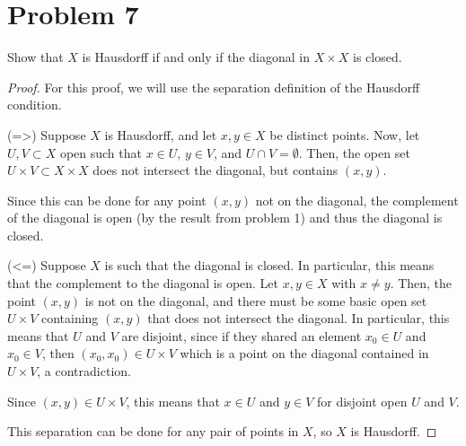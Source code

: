 \documentclass[fontsize=11pt]{scrartcl} %
\numberwithin{equation}{section} %
\numberwithin{figure}{section} %
\numberwithin{table}{section} %
\begin{document}
\section*{Problem 7}
Show that $X$ is Hausdorff if and only if the diagonal in $X\times X$ is closed.
\\
\begin{proof}
For this proof, we will use the separation definition of the Hausdorff condition.

(=>)
Suppose $X$ is Hausdorff, and let $x,y\in X$ be distinct points. Now, let $U,V\subset X$ open
such that $x\in U$, $y\in V$, and $U\cap V = \emptyset$. Then, the open set
$U\times V\subset X\times X$ does not intersect the diagonal, but contains $(x,y)$.

Since this can be done for any point $(x,y)$ not on the diagonal, the complement of the diagonal
is open (by the result from problem 1) and thus the diagonal is closed.

(<=)
Suppose $X$ is such that the diagonal is closed. In particular, this means that the
complement to the diagonal is open. Let $x,y\in X$ with $x\neq y$. Then, the point
$(x,y)$ is not on the diagonal, and there must be some basic open set $U\times V$ containing
$(x,y)$ that does not intersect the diagonal. In particular, this means that $U$ and $V$
are disjoint, since if they shared an element $x_0\in U$ and $x_0\in V$, then $(x_0,x_0)\in U\times V$
which is a point on the diagonal contained in $U\times V$, a contradiction.

Since $(x,y)\in U\times V$, this means that $x\in U$ and $y\in V$ for disjoint open $U$ and $V$.

This separation can be done for any pair of points in $X$, so $X$ is Hausdorff.
\end{proof}


\end{document}

